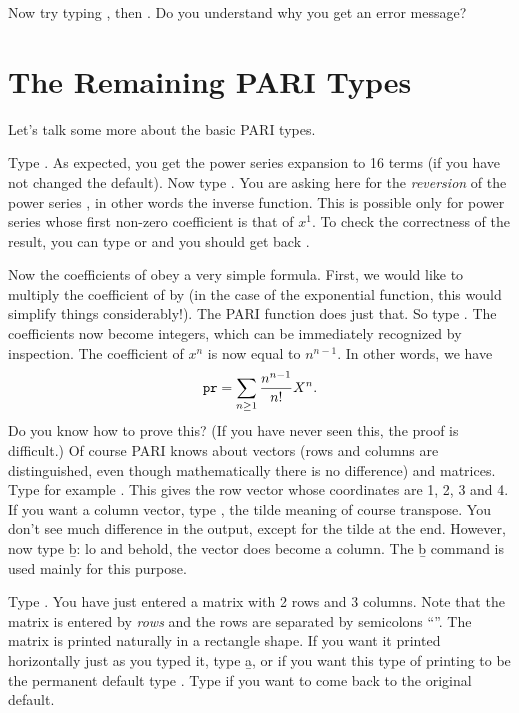 Now try typing , then
. Do you understand why you get an error message?

\section{The Remaining PARI Types}
Let's talk some more about the basic PARI types.

Type . As expected, you get the power series expansion
to 16 terms (if you have not changed the default). Now type
. You are asking here for the {\it reversion\/} of the
power series , in other words the inverse function. This is possible
only for power series whose first non-zero coefficient is that of $x^1$.  To
check the correctness of the result, you can type  or
 and you should get back .

Now the coefficients of  obey a very simple formula. First, we would
like to multiply the coefficient of  by  (in the case of
the exponential function, this would simplify things considerably!). The PARI
function  does just that. So type .
The coefficients now become integers, which can be immediately recognized by
inspection. The coefficient of $x^n$ is now equal to
$n^{n-1}$. In other words, we have
%
$${\tt pr} = \sum_{n\ge1}{{n^{n-1}}\over{n!}} X^{n}.$$
%
Do you know how to prove this? (If you have never seen this, the proof is
difficult.)
\smallskip
%
Of course PARI knows about vectors (rows and columns are distinguished, even
though mathematically there is no difference) and matrices. Type for example
\kbd{[1,2,3,4]}. This gives the row vector whose coordinates are 1, 2, 3 and
4.  If you want a column vector, type \kbd{[1,2,3,4]\til}, the tilde meaning
of course transpose. You don't see much difference in the output, except for
the tilde at the end. However, now type \b{b}: lo and behold, the vector does
become a column. The \b{b} command is used mainly for this purpose.

Type . You have just entered a matrix with 2 rows and
3 columns. Note that the matrix is entered by {\it rows\/} and the rows are
separated by semicolons ``\kbd{;}''. The matrix is printed naturally in a
rectangle shape. If you want it printed horizontally just as you typed it,
type \b{a}, or if you want this type of printing to be the permanent default
type . Type  if you want to
come back to the original default.

